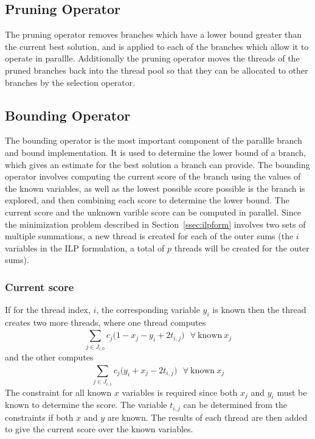 \documentclass[10pt,a4paer,twocolumn]{article}
\begin{document}
\subsection{Pruning Operator}

The pruning operator removes branches which have a lower bound greater than the current best
solution, and is applied to each of the branches which allow it to operate in parallle. Additionally the 
pruning operator moves the threads of the pruned branches back into the thread pool so that they can be
allocated to other branches by the selection operator.

\subsection{Bounding Operator}

The bounding operator is the most important component of the parallle branch and bound implementation. It is
used to determine the lower bound of a branch, which gives an estimate for the best solution a branch can
provide. 
The bounding operator involves computing the current score of the branch using the values of the
known variables, as well as the lowest possible score possible is the branch is explored, and then combining each
score to determine the lower bound. The current score and the unknown varible score can be computed in
parallel. Since the minimization problem described in Section~\ref{ssec:ilpform} involves two sets of 
multiple summations, a new thread is created for each of the outer sums (the $i$ variables in the ILP 
formulation, a total of $p$ threads will be created for the outer sums). 

\subsubsection{Current score}
If for the thread index, $i$, the corresponding variable $y_i$ is known then the thread creates two more 
threads, where one thread computes 
\begin{equation*}
    \sum_{j \in J_{i,0}}^{}{c_j(1 - x_j - y_i + 2t_{i,j}})  \ \ \ \forall \ \textrm{known} \ x_j
\end{equation*}
and the other computes
\begin{equation*}
    \sum_{j \in J_{i,1}}^{}{c_j(y_i + x_j - 2t_{i,j}})  \ \ \ \forall \ \textrm{known} \ x_j
\end{equation*}
The constraint for all known $x$ variables is required since both $x_j$ and $y_i$ must be known to determine
the score. The variable $t_{i,j}$ can be determined from the constraints if both $x$ and $y$ are known.
The results of each thread are then added to give the current score over the known variables.
\end{document}
